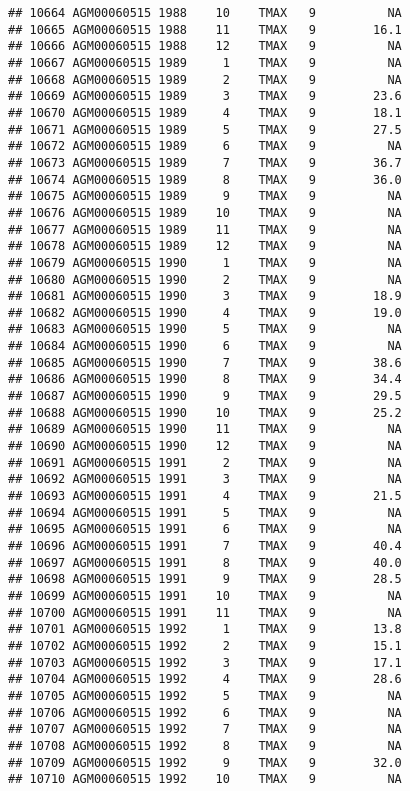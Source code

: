 \documentclass{article}\usepackage[]{graphicx}\usepackage[]{color}
\makeatletter
\newenvironment{kframe}{%
 \def\at@end@of@kframe{}%
 \ifinner\ifhmode%
  \def\at@end@of@kframe{\end{minipage}}%
  \begin{minipage}{\columnwidth}%
 \fi\fi%
 \def\FrameCommand##1{\hskip\@totalleftmargin \hskip-\fboxsep
 \colorbox{shadecolor}{##1}\hskip-\fboxsep
     \hskip-\linewidth \hskip-\@totalleftmargin \hskip\columnwidth}%
 \MakeFramed {\advance\hsize-\width
   \@totalleftmargin\z@ \linewidth\hsize
   \@setminipage}}%
 {\par\unskip\endMakeFramed%
 \at@end@of@kframe}
\newenvironment{knitrout}{}{} %
\makeatother
\begin{document}
\begin{knitrout}
\begin{kframe}
\begin{verbatim}
## 10664 AGM00060515 1988    10    TMAX   9          NA
## 10665 AGM00060515 1988    11    TMAX   9        16.1
## 10666 AGM00060515 1988    12    TMAX   9          NA
## 10667 AGM00060515 1989     1    TMAX   9          NA
## 10668 AGM00060515 1989     2    TMAX   9          NA
## 10669 AGM00060515 1989     3    TMAX   9        23.6
## 10670 AGM00060515 1989     4    TMAX   9        18.1
## 10671 AGM00060515 1989     5    TMAX   9        27.5
## 10672 AGM00060515 1989     6    TMAX   9          NA
## 10673 AGM00060515 1989     7    TMAX   9        36.7
## 10674 AGM00060515 1989     8    TMAX   9        36.0
## 10675 AGM00060515 1989     9    TMAX   9          NA
## 10676 AGM00060515 1989    10    TMAX   9          NA
## 10677 AGM00060515 1989    11    TMAX   9          NA
## 10678 AGM00060515 1989    12    TMAX   9          NA
## 10679 AGM00060515 1990     1    TMAX   9          NA
## 10680 AGM00060515 1990     2    TMAX   9          NA
## 10681 AGM00060515 1990     3    TMAX   9        18.9
## 10682 AGM00060515 1990     4    TMAX   9        19.0
## 10683 AGM00060515 1990     5    TMAX   9          NA
## 10684 AGM00060515 1990     6    TMAX   9          NA
## 10685 AGM00060515 1990     7    TMAX   9        38.6
## 10686 AGM00060515 1990     8    TMAX   9        34.4
## 10687 AGM00060515 1990     9    TMAX   9        29.5
## 10688 AGM00060515 1990    10    TMAX   9        25.2
## 10689 AGM00060515 1990    11    TMAX   9          NA
## 10690 AGM00060515 1990    12    TMAX   9          NA
## 10691 AGM00060515 1991     2    TMAX   9          NA
## 10692 AGM00060515 1991     3    TMAX   9          NA
## 10693 AGM00060515 1991     4    TMAX   9        21.5
## 10694 AGM00060515 1991     5    TMAX   9          NA
## 10695 AGM00060515 1991     6    TMAX   9          NA
## 10696 AGM00060515 1991     7    TMAX   9        40.4
## 10697 AGM00060515 1991     8    TMAX   9        40.0
## 10698 AGM00060515 1991     9    TMAX   9        28.5
## 10699 AGM00060515 1991    10    TMAX   9          NA
## 10700 AGM00060515 1991    11    TMAX   9          NA
## 10701 AGM00060515 1992     1    TMAX   9        13.8
## 10702 AGM00060515 1992     2    TMAX   9        15.1
## 10703 AGM00060515 1992     3    TMAX   9        17.1
## 10704 AGM00060515 1992     4    TMAX   9        28.6
## 10705 AGM00060515 1992     5    TMAX   9          NA
## 10706 AGM00060515 1992     6    TMAX   9          NA
## 10707 AGM00060515 1992     7    TMAX   9          NA
## 10708 AGM00060515 1992     8    TMAX   9          NA
## 10709 AGM00060515 1992     9    TMAX   9        32.0
## 10710 AGM00060515 1992    10    TMAX   9          NA

\end{verbatim}
\end{kframe}
\end{knitrout}
\end{document}
